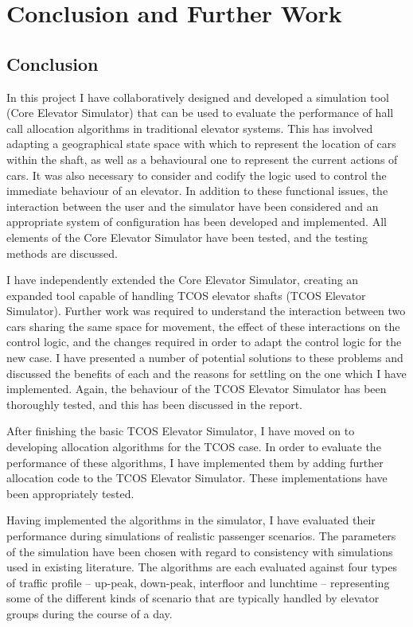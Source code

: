 \documentclass{UoYCSproject}
\begin{document}
\chapter{Conclusion and Further Work}

\section{Conclusion}

In this project I have collaboratively designed and developed a simulation tool (Core Elevator Simulator) that can be used to evaluate the performance of hall call allocation algorithms in traditional elevator systems.  This has involved adapting a geographical state space with which to represent the location of cars within the shaft, as well as a behavioural one to represent the current actions of cars.  It was also necessary to consider and codify the logic used to control the immediate behaviour of an elevator.  In addition to these functional issues, the interaction between the user and the simulator have been considered and an appropriate system of configuration has been developed and implemented.  All elements of the Core Elevator Simulator have been tested, and the testing methods are discussed.

I have independently extended the Core Elevator Simulator, creating an expanded tool capable of handling TCOS elevator shafts (TCOS Elevator Simulator).  Further work was required to understand the interaction between two cars sharing the same space for movement, the effect of these interactions on the control logic, and the changes required in order to adapt the control logic for the new case.  I have presented a number of potential solutions to these problems and discussed the benefits of each and the reasons for settling on the one which I have implemented.  Again, the behaviour of the TCOS Elevator Simulator has been thoroughly tested, and this has been discussed in the report.

After finishing the basic TCOS Elevator Simulator, I have moved on to developing allocation algorithms for the TCOS case.  In order to evaluate the performance of these algorithms, I have implemented them by adding further allocation code to the TCOS Elevator Simulator.  These implementations have been appropriately tested.

Having implemented the algorithms in the simulator, I have evaluated their performance during simulations of realistic passenger scenarios.  The parameters of the simulation have been chosen with regard to consistency with simulations used in existing literature.  The algorithms are each evaluated against four types of traffic profile -- up-peak, down-peak, interfloor and lunchtime -- representing some of the different kinds of scenario that are typically handled by elevator groups during the course of a day.
\end{document}
